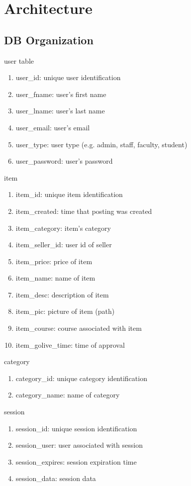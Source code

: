 \section{Architecture}

\subsection{DB Organization}

{\large user table}
\begin{enumerate}
\item user\_id: unique user identification
\item user\_fname: user's first name
\item user\_lname: user's last name
\item user\_email: user's email
\item user\_type: user type (e.g. admin, staff, faculty, student)
\item user\_password: user's password
\end{enumerate}%
%
{\large item}
\begin{enumerate}
\item item\_id: unique item identification
\item item\_created: time that posting was created
\item item\_category: item's category
\item item\_seller\_id: user id of seller
\item item\_price: price of item
\item item\_name: name of item
\item item\_desc: description of item
\item item\_pic: picture of item (path)
\item item\_course: course associated with item
\item item\_golive\_time: time of approval 
\end{enumerate}%
%
{\large category}
\begin{enumerate}
\item category\_id: unique category identification
\item category\_name: name of category
\end{enumerate}
%
{\large session}
\begin{enumerate}
\item session\_id: unique session identification
\item session\_user: user associated with session
\item session\_expires: session expiration time
\item session\_data: session data
\end{enumerate}%
